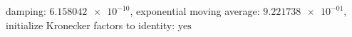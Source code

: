 damping: $\num[scientific-notation=true]{6.158042e-10}$, exponential moving average: $\num[scientific-notation=true]{9.221738e-01}$, initialize Kronecker factors to identity: $\text{yes}$